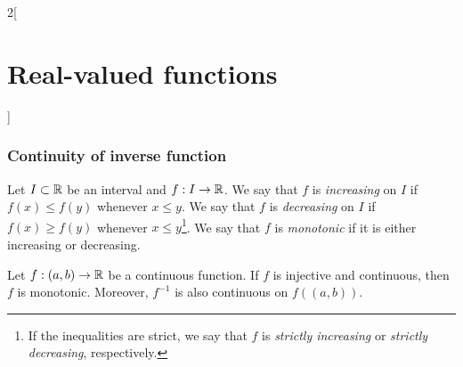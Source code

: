 \documentclass[../../../main_math.tex]{subfiles}
\begin{document}
\begin{multicols}{2}[\section{Real-valued functions}]
  \subsubsection{Continuity of inverse function}
  \begin{definition}
    Let $I\subset\mathbb{R}$ be an interval and $f:I\rightarrow\mathbb{R}$. We say that $f$ is \emph{increasing} on $I$ if $f(x)\leq f(y)$ whenever $x\leq y$. We say that $f$ is \emph{decreasing} on $I$ if $f(x)\geq f(y)$ whenever $x\leq y$\footnote{If the inequalities are strict, we say that $f$ is \emph{strictly increasing} or \emph{strictly decreasing}, respectively.}. We say that $f$ is \emph{monotonic} if it is either increasing or decreasing.
  \end{definition}
  \begin{theorem}
    Let $f:(a,b)\rightarrow\mathbb{R}$ be a continuous function. If $f$ is injective and continuous, then $f$ is monotonic. Moreover, $f^{-1}$ is also continuous on $f((a,b))$.
  \end{theorem}

\end{multicols}
\end{document}
